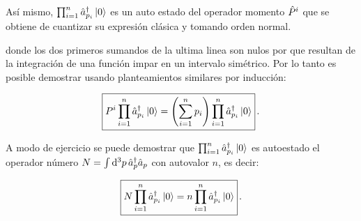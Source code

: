 Así mismo, $\prod_{i=1}^n \hat{a}_{p_i}^\dag \ket{0}$ es un auto estado del operador momento $\hat{P}^i$ que se obtiene de cuantizar su expresión clásica y tomando orden normal.


donde los dos primeros sumandos de la ultima linea son nulos por que resultan de la integración de una función impar en un intervalo simétrico. Por lo tanto es posible demostrar usando planteamientos similares por inducción:

\begin{equation}
\boxed{
    P^i \prod_{i=1}^n \hat{a}_{p_i}^\dag \ket{0} = \qty(\sum_{i=1}^n p_i) \prod_{i=1}^n \hat{a}_{p_i}^\dag \ket{0}} \, .
    \label{eq_3.71}
\end{equation}

A modo de ejercicio se puede demostrar que $\prod_{i=1}^n \hat{a}_{p_i}^\dag \ket{0}$ es autoestado el operador número $N = \int \dd[3]{p} \hat{a}_p^\dag \hat{a}_p$ con autovalor $n$, es decir:

\begin{equation}
\boxed{
    N \prod_{i=1}^n \hat{a}_{p_i}^\dag \ket{0} = n \prod_{i=1}^n \hat{a}_{p_i}^\dag \ket{0} } \, .
    \label{eq_3.72}
\end{equation}

